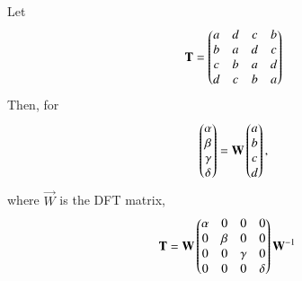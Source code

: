 %
\begin{lemma}
Let     
\begin{align}
    \mathbf{T} = \begin{pmatrix}a & d & c & b\\ b & a & d & c\\ c & b & a & d\\d & c & b & a\end{pmatrix}
\end{align}
Then, for 
\begin{align}
    \begin{pmatrix}\alpha \\ \beta \\ \gamma \\ \delta\end{pmatrix} = \mathbf{W}  \begin{pmatrix}a \\ b \\ c \\ d\end{pmatrix},
\end{align}
where $\vec{W}$ is the DFT matrix,
%
\begin{align}
    \mathbf{T} = \mathbf{W}&\begin{pmatrix}\alpha & 0 & 0 & 0\\ 0 & \beta & 0 & 0\\ 0 & 0 & \gamma & 0\\ 0 & 0 & 0 & \delta\end{pmatrix} \mathbf{W}^{-1}
    \label{2019/33/spectrum}
\end{align}

 \end{lemma}



